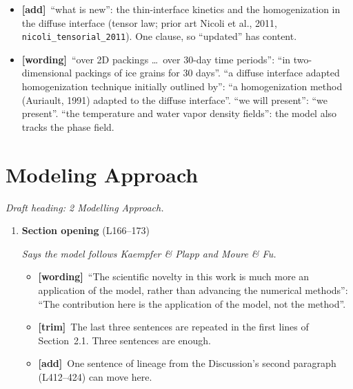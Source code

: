 \documentclass[11pt]{article}
\newcommand{\Pg}[3]{\item \textbf{#1} {\small(#2)}\par\textit{#3}}
\newcommand{\tG}{\textcolor{stale}{\textbf{[wording]}}\ }
\newcommand{\tT}{\textcolor{cut}{\textbf{[trim]}}\ }
\newcommand{\tA}{\textcolor{have}{\textbf{[add]}}\ }
\begin{document}
\begin{enumerate}
\begin{itemize}
    where a reader learns the paper does not model Enceladus conditions
    directly.
  \item \tA ``what is new'': the thin-interface kinetics and the
    homogenization in the diffuse interface (tensor law; prior art Nicoli
    et al., 2011, \texttt{nicoli\_tensorial\_2011}). One clause, so
    ``updated'' has content.
  \item \tG ``over 2D packings \ldots\ over 30-day time periods'': ``in
    two-dimensional packings of ice grains for 30 days''. ``a diffuse
    interface adapted homogenization technique initially outlined by'':
    ``a homogenization method (Auriault, 1991) adapted to the diffuse
    interface''. ``we will present'': ``we present''. ``the temperature and
    water vapor density fields'': the model also tracks the phase field.
  \end{itemize}
\end{enumerate}

\section{Modeling Approach}
\textit{Draft heading: 2 Modelling Approach.}
\begin{enumerate}
\Pg{Section opening}{L166--173}{Says the model follows Kaempfer \& Plapp and Moure \& Fu.}
  \begin{itemize}
  \item \tG ``The scientific novelty in this work is much more an application
    of the model, rather than advancing the numerical methods'': ``The
    contribution here is the application of the model, not the method''.
  \item \tT The last three sentences are repeated in the first lines of
    Section~2.1. Three sentences are enough.
  \item \tA One sentence of lineage from the Discussion's second paragraph
    (L412--424) can move here.
  \end{itemize}
\end{enumerate}
\end{document}
